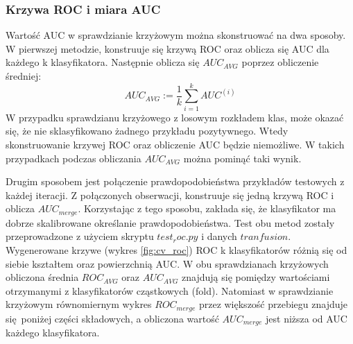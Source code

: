 \subsubsection{Krzywa ROC i miara AUC}
Wartość AUC w sprawdzianie krzyżowym można skonstruować na dwa sposoby. W pierwszej metodzie, konstruuje się krzywą ROC oraz oblicza się AUC dla każdego k klasyfikatora. Następnie oblicza się $AUC_{AVG}$ poprzez obliczenie średniej:
\[AUC_{AVG} := \frac{1}{k} \sum_{i=1}^{k} AUC^{(i)} \]
W przypadku sprawdzianu krzyżowego z losowym rozkładem klas, może okazać się, że nie sklasyfikowano żadnego przykładu pozytywnego. Wtedy skonstruowanie krzywej ROC oraz obliczenie AUC będzie niemożliwe. W takich przypadkach podczas obliczania $AUC_{AVG}$ można pominąć taki wynik. \par
Drugim sposobem jest połączenie prawdopodobieństwa przykładów testowych z każdej iteracji. Z połączonych obserwacji, konstruuje się jedną krzywą ROC i oblicza $AUC_{merge}$. Korzystając z tego sposobu, zakłada się, że klasyfikator ma dobrze skalibrowane określanie prawdopodobieństwa.  Test obu metod zostały przeprowadzone z użyciem skryptu $test_roc.py$ i danych $tranfusion$. Wygenerowane krzywe (wykres \ref{fig:cv_roc}) ROC k klasyfikatorów różnią się od siebie kształtem oraz powierzchnią AUC. W obu sprawdzianach krzyżowych obliczona średnia $ROC_{AVG}$ oraz $AUC_{AVG}$ znajdują się pomiędzy wartościami otrzymanymi z klasyfikatorów cząstkowych (fold). Natomiast w sprawdzianie krzyżowym równomiernym wykres $ROC_{merge}$ przez większość przebiegu znajduje się poniżej części składowych, a obliczona wartość $AUC_{merge}$ jest niższa od AUC każdego klasyfikatora.
